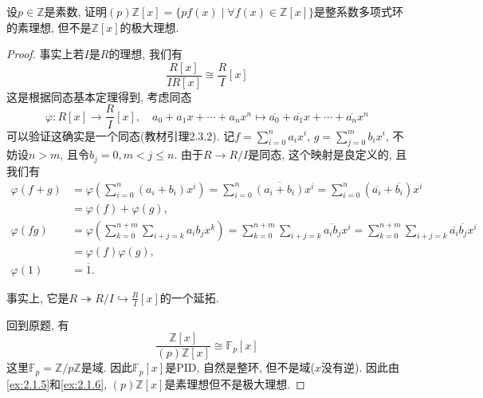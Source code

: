\begin{problem}\label{ex:2.1.8}
    设$p \in \mathbb{Z}$是素数, 证明$(p)\mathbb{Z}[x] = \{pf(x) \mid \forall f(x) \in \mathbb{Z}[x]\}$是整系数多项式环的素理想, 但不是$\mathbb{Z}[x]$的极大理想.
\end{problem}

\begin{proof}
    事实上若$I$是$R$的理想, 我们有
    \[
        \frac{R[x]}{IR[x]} \cong \frac{R}{I}[x]
    \]
    这是根据同态基本定理得到, 考虑同态
    \[
        \varphi: R[x] \to \frac{R}{I}[x],\quad a_0 + a_1x + \cdots + a_nx^n \mapsto \overline{a_0} + \overline{a_1}x + \cdots + \overline{a_n}x^n
    \]
    可以验证这确实是一个同态(教材引理2.3.2). 记$f = \sum_{i = 0}^{n} a_ix^i$, $g = \sum_{j = 0}^{m} b_ix^i$, 不妨设$n > m$, 且令$b_j = 0, m < j \leqslant n$. 由于$R \to R/I$是同态, 这个映射是良定义的, 且我们有
    \[
    \begin{aligned}
        \varphi(f + g) &= \varphi\left(\sum_{i = 0}^{n} (a_i + b_i)x^i\right) = \sum_{i = 0}^{n} \overline{(a_i + b_i)}x^i = \sum_{i = 0}^{n} (\overline{a_i} + \overline{b_i})x^i\\
        &= \varphi(f) + \varphi(g),\\
        \varphi(fg) &= \varphi\left(\sum_{k = 0}^{n + m}\sum_{i + j = k} a_ib_jx^k\right) = \sum_{k = 0}^{n + m}\sum_{i + j = k} \overline{a_ib_j}x^i = \sum_{k = 0}^{n + m}\sum_{i + j = k} \overline{a_i}\overline{b_j}x^i\\
        &= \varphi(f)\varphi(g),\\
        \varphi(1) &= \overline{1}.
    \end{aligned} 
    \]
    
    事实上, 它是$R \twoheadrightarrow R/I \hookrightarrow \frac{R}{I}[x]$的一个延拓.
    
    回到原题, 有
    \[
        \frac{\mathbb{Z}[x]}{(p)\mathbb{Z}[x]} \cong \mathbb{F}_p[x]
    \]
    这里$\mathbb{F}_p = \mathbb{Z}/p\mathbb{Z}$是域. 因此$\mathbb{F}_p[x]$是PID, 自然是整环, 但不是域($x$没有逆). 因此由\ref{ex:2.1.5}和\ref{ex:2.1.6}, $(p)\mathbb{Z}[x]$是素理想但不是极大理想.
\end{proof}

